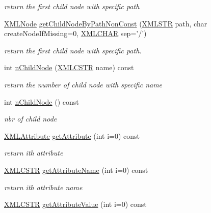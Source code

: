 \begin{DoxyCompactItemize}
\begin{DoxyCompactList}\small\item\em return the first child node with specific path \end{DoxyCompactList}\item 
\hyperlink{structXMLNode}{X\-M\-L\-Node} \hyperlink{group__navigate_ga0f3b175875c5d35a0dd88b4ed836079d}{get\-Child\-Node\-By\-Path\-Non\-Const} (\hyperlink{xmlParser_8h_a849d96105aa0c8f64b5c10d9151a3cdc}{X\-M\-L\-S\-T\-R} path, char create\-Node\-If\-Missing=0, \hyperlink{xmlParser_8h_a9f587fbd233e721e8818a3bf8102838f}{X\-M\-L\-C\-H\-A\-R} sep='/')
\begin{DoxyCompactList}\small\item\em return the first child node with specific path. \end{DoxyCompactList}\item 
int \hyperlink{group__navigate_ga8e52198f258167cd796dae21f1ffc352}{n\-Child\-Node} (\hyperlink{xmlParser_8h_acdb0d6fd8dd596384b438d86cfb2b182}{X\-M\-L\-C\-S\-T\-R} name) const 
\begin{DoxyCompactList}\small\item\em return the number of child node with specific name \end{DoxyCompactList}\item 
int \hyperlink{group__navigate_ga65aad0220b231b1bf5cd5c69d7c5de41}{n\-Child\-Node} () const 
\begin{DoxyCompactList}\small\item\em nbr of child node \end{DoxyCompactList}\item 
\hyperlink{structXMLAttribute}{X\-M\-L\-Attribute} \hyperlink{group__navigate_gaa07572a057ce7ffc8843e468d952f490}{get\-Attribute} (int i=0) const 
\begin{DoxyCompactList}\small\item\em return ith attribute \end{DoxyCompactList}\item 
\hyperlink{xmlParser_8h_acdb0d6fd8dd596384b438d86cfb2b182}{X\-M\-L\-C\-S\-T\-R} \hyperlink{group__navigate_ga67cf7717fa32175d8c6daa8f3f03ce7a}{get\-Attribute\-Name} (int i=0) const 
\begin{DoxyCompactList}\small\item\em return ith attribute name \end{DoxyCompactList}\item 
\hyperlink{xmlParser_8h_acdb0d6fd8dd596384b438d86cfb2b182}{X\-M\-L\-C\-S\-T\-R} \hyperlink{group__navigate_ga4abc0c5a3eec14e2f67518b625431541}{get\-Attribute\-Value} (int i=0) const 

\end{DoxyCompactItemize}
